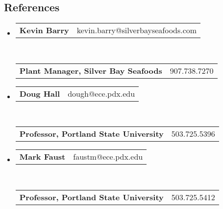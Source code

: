 \documentclass[10pt,letterpaper]{article}
\makeatletter
\newcommand{\headerrow}[2]
{\begin{tabular*}{\linewidth}{l@{\extracolsep{\fill}}r}
	#1 &
	#2 \\
\end{tabular*}}
\makeatother
\begin{document}
\subsection*{References}
\begin{itemize}
  \item
  \headerrow
    {\textbf{Kevin Barry}}
    {kevin.barry@silverbayseafoods.com}
  \\
  \headerrow
    {\textbf{Plant Manager, Silver Bay Seafoods}}
    {907.738.7270}
  \item
  \headerrow
    {\textbf{Doug Hall}}
    {dough@ece.pdx.edu}
  \\
  \headerrow
    {\textbf{Professor, Portland State University}}
    {503.725.5396}
  \item
  \headerrow
    {\textbf{Mark Faust}}
    {faustm@ece.pdx.edu}
  \\
  \headerrow
    {\textbf{Professor, Portland State University}}
    {503.725.5412}
    
\end{itemize}
\end{document}
